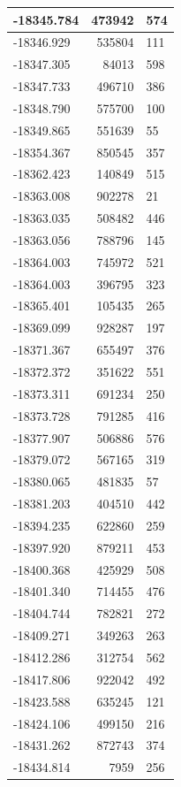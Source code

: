 \documentclass[]{book}
\theoremstyle{definition}
\theoremstyle{definition}
\theoremstyle{definition}
\theoremstyle{remark}
\begin{document}
\begin{tabular}{l|r|l}
\hline
-18345.784 & 473942 & 574\\
\hline
-18346.929 & 535804 & 111\\
\hline
-18347.305 & 84013 & 598\\
\hline
-18347.733 & 496710 & 386\\
\hline
-18348.790 & 575700 & 100\\
\hline
-18349.865 & 551639 & 55\\
\hline
-18354.367 & 850545 & 357\\
\hline
-18362.423 & 140849 & 515\\
\hline
-18363.008 & 902278 & 21\\
\hline
-18363.035 & 508482 & 446\\
\hline
-18363.056 & 788796 & 145\\
\hline
-18364.003 & 745972 & 521\\
\hline
-18364.003 & 396795 & 323\\
\hline
-18365.401 & 105435 & 265\\
\hline
-18369.099 & 928287 & 197\\
\hline
-18371.367 & 655497 & 376\\
\hline
-18372.372 & 351622 & 551\\
\hline
-18373.311 & 691234 & 250\\
\hline
-18373.728 & 791285 & 416\\
\hline
-18377.907 & 506886 & 576\\
\hline
-18379.072 & 567165 & 319\\
\hline
-18380.065 & 481835 & 57\\
\hline
-18381.203 & 404510 & 442\\
\hline
-18394.235 & 622860 & 259\\
\hline
-18397.920 & 879211 & 453\\
\hline
-18400.368 & 425929 & 508\\
\hline
-18401.340 & 714455 & 476\\
\hline
-18404.744 & 782821 & 272\\
\hline
-18409.271 & 349263 & 263\\
\hline
-18412.286 & 312754 & 562\\
\hline
-18417.806 & 922042 & 492\\
\hline
-18423.588 & 635245 & 121\\
\hline
-18424.106 & 499150 & 216\\
\hline
-18431.262 & 872743 & 374\\
\hline
-18434.814 & 7959 & 256\\

\end{tabular}
\end{document}
